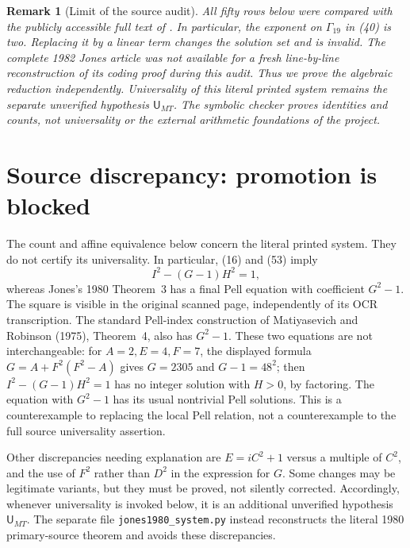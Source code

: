 \documentclass[11pt]{article}
\newtheorem{remark}[theorem]{Remark}
\begin{document}
\begin{remark}[Limit of the source audit]
All fifty rows below were compared with the publicly accessible full text
of \cite{MT}. In particular, the exponent on \(\Gamma_{19}\) in (40) is
\emph{two}. Replacing it by a linear term changes the solution set and is
invalid. The complete 1982 Jones article was not available for a fresh
line-by-line reconstruction of its coding proof during this audit. Thus we
prove the algebraic reduction independently. Universality of this literal
printed system remains the separate unverified hypothesis $\mathsf U_{MT}$. The symbolic checker proves identities and counts,
not universality or the external arithmetic foundations of the project.
\end{remark}

\section{Source discrepancy: promotion is blocked}
The count and affine equivalence below concern the literal printed system.
They do not certify its universality. In particular, (16) and (53) imply
\[
 I^2-(G-1)H^2=1,
\]
whereas Jones's 1980 Theorem~3 has a final Pell equation with coefficient
\(G^2-1\). The square is visible in the original scanned page, independently
of its OCR transcription. The standard Pell-index construction of Matiyasevich
and Robinson (1975), Theorem~4, also has \(G^2-1\). These two equations are
not interchangeable: for \(A=2,E=4,F=7\), the displayed formula
\(G=A+F^2(F^2-A)\) gives \(G=2305\) and \(G-1=48^2\); then
\(I^2-(G-1)H^2=1\) has no integer solution with \(H>0\), by factoring.
The equation with \(G^2-1\) has its usual nontrivial Pell solutions.
This is a counterexample to replacing the local Pell relation, not a
counterexample to the full source universality assertion.

Other discrepancies needing explanation are \(E=iC^2+1\) versus a multiple
of \(C^2\), and the use of \(F^2\) rather than \(D^2\) in the expression
for \(G\). Some changes may be legitimate variants, but they must be
proved, not silently corrected. Accordingly, whenever universality is
invoked below, it is an additional unverified hypothesis \(\mathsf U_{MT}\).
The separate file \texttt{jones1980\_system.py} instead reconstructs the
literal 1980 primary-source theorem and avoids these discrepancies.
\end{document}

